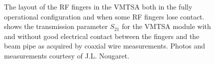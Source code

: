 \begin{figure}
\begin{center}
\end{center}
\caption{The layout of the RF fingers in the VMTSA both in  the fully operational configuration and  when some RF fingers lose contact.  shows the transmission parameter $S_{21}$ for the VMTSA module with and without good electrical contact between the fingers and the beam pipe as acquired by coaxial wire measurements. Photos and measurements courtesy of J.L. Nougaret.}
\label{fig:rf_finger_imp}
\end{figure}